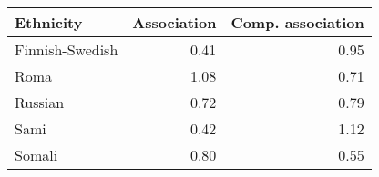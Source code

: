 \begin{tabular}{lrr}
\toprule
      Ethnicity &  Association &  Comp. association \\
\midrule
Finnish-Swedish &         0.41 &               0.95 \\
           Roma &         1.08 &               0.71 \\
        Russian &         0.72 &               0.79 \\
           Sami &         0.42 &               1.12 \\
         Somali &         0.80 &               0.55 \\
\bottomrule
\end{tabular}
